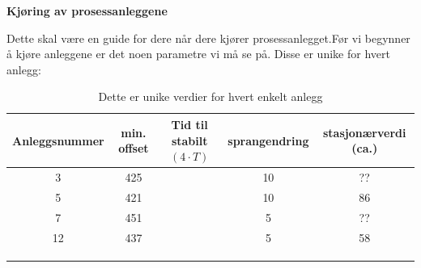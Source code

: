 \documentclass{minmal}
\begin{document}
\begin{center}
\textbf{Kjøring av prosessanleggene}   
\end{center}
Dette skal være en guide for dere når dere kjører prosessanlegget.Før vi begynner å kjøre anleggene er det noen parametre vi må se på.  Disse er unike for hvert anlegg:\\

\begin{table}[h]
    \centering
    \begin{tabular}{|c|c|c|c|c|}
    \hline
         Anleggsnummer&min. offset&Tid til stabilt$(4\cdot T)$& sprangendring&stasjonærverdi (ca.)\\
    \hline
         3& 425 &  & 10&??\\
        \hline
         5& 421 &  & 10&86\\
    \hline
         7&451  &  &5&?? \\
    \hline     
        12&437  &  & 5&58\\
    \hline     
         &  &  & &\\
    \hline     
         &  &  & &\\
    \hline     
         &  &  & &\\
    \hline     
    \end{tabular}
    \caption{Dette er unike verdier for hvert enkelt anlegg}
    \label{tab:placeholder}
\end{table}
\end{document}
